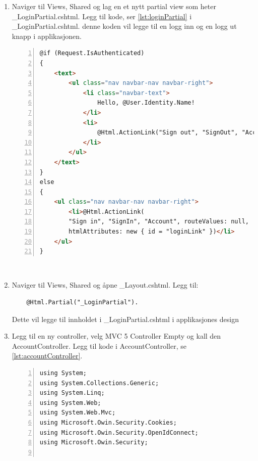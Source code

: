 \begin{enumerate}
\begin{lstlisting}[captionpos=b, caption={Startup.cs},label={lst:startup},numbers=left]
[assembly: OwinStartup(typeof(WebApp_OpenIDConnect_DotNet.Startup))]

namespace WebApp_OpenIDConnect_DotNet
{    {
    public partial class Startup
    {
        public void Configuration(IAppBuilder app)
        {
            ConfigureAuth(app);
        }
    }
}
\end{lstlisting}
\\
\item Naviger til Views, Shared og lag en et nytt partial view som heter \_LoginPartial.cshtml. Legg til kode, ser \ref{lst:loginPartial} i \_LoginPartial.cshtml. denne koden vil legge til en logg inn og en logg ut knapp i applikasjonen.
\begin{lstlisting}[captionpos=b, caption={LoginPartial.cs},label={lst:loginPartial},numbers=left, language=HTML]
@if (Request.IsAuthenticated)
{
    <text>
        <ul class="nav navbar-nav navbar-right">
            <li class="navbar-text">
                Hello, @User.Identity.Name!
            </li>
            <li>
                @Html.ActionLink("Sign out", "SignOut", "Account")
            </li>
        </ul>
    </text>
}
else
{
    <ul class="nav navbar-nav navbar-right">
        <li>@Html.ActionLink(
        "Sign in", "SignIn", "Account", routeValues: null, 
        htmlAttributes: new { id = "loginLink" })</li>
    </ul>
}
\end{lstlisting}
\\
\item Naviger til Views, Shared og åpne \_Layout.cshtml. Legg til:
\begin{lstlisting}
    @Html.Partial("_LoginPartial").
\end{lstlisting}
Dette vil legge til innholdet i \_LoginPartial.cshtml i applikasjones design
\\
\item Legg til en ny controller, velg MVC 5 Controller Empty og kall den AccountController. Legg til kode i AccountController, se \ref{lst:accountController}.
\begin{lstlisting}[captionpos=b, caption={AccountController.cs},label={lst:accountController},numbers=left]
using System;
using System.Collections.Generic;
using System.Linq;
using System.Web;
using System.Web.Mvc;
using Microsoft.Owin.Security.Cookies;
using Microsoft.Owin.Security.OpenIdConnect;
using Microsoft.Owin.Security;


\end{lstlisting}
\end{enumerate}
